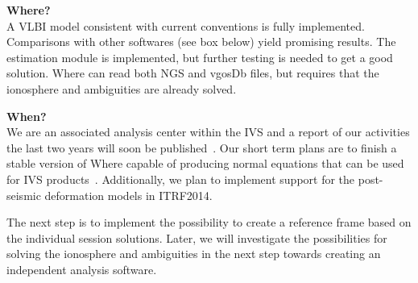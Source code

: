 {\large\bfseries Where?}\\

A VLBI model consistent with current conventions is fully implemented.
Comparisons with other softwares (see box below) yield promising results. The
estimation module is implemented, but further testing is needed to get a good
solution. Where can read both NGS and vgosDb files, but requires that the
ionosphere and ambiguities are already solved.


{\large\bfseries When?}\\

We are an associated analysis center within the IVS and a report of our
activities the last two years will soon be published~\cite{kirkvik2017}. Our
short term plans are to finish a stable version of Where capable of producing
normal equations that can be used for IVS products~\cite{mysen2017}.
Additionally, we plan to implement support for the post-seismic deformation
models in ITRF2014.

The next step is to implement the possibility to create a reference frame based
on the individual session solutions. Later, we will investigate the
possibilities for solving the ionosphere and ambiguities in the next step
towards creating an independent analysis software.

\endinput
